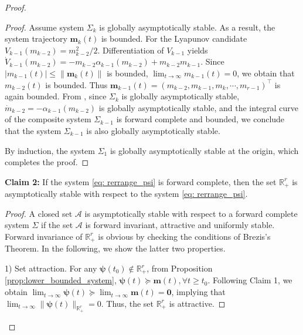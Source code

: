 \documentclass[letterpaper, 10 pt, journal, twoside]{IEEEtran}
\theoremstyle{plain}
\newcommand{\myvar}[1]{\bm{#1}}
\newcommand{\myset}[1]{\mathscr{#1}}
\begin{document}
\begin{proof}
\begin{proof}
Assume system  $\Sigma_{k}$ is globally asymptotically stable.  As a result, the system trajectory $\myvar{m}_k(t)$ is bounded.  {For the} Lyapunov candidate $V_{k-1}(m_{k-2}) = m_{k-2}^2/2$. Differentiation of $V_{k-1}$ yields $ \dot{V}_{k-1}(m_{k-2})  = - m_{k-2}\alpha_{k-1}(m_{k-2})  + m_{k-2} m_{k-1}$.
 Since $| m_{k-1}(t)| \leq \| \myvar{m}_k(t) \| $ is bounded, $\lim_{t \to \infty} m_{k-1}(t) = 0$, we obtain that $ m_{k-2}(t)$ is bounded. Thus $\myvar{m}_{k-1}(t) = (m_{k-2}, m_{k-1}, m_{k}, \cdots, m_{r-1})^\top$ is again bounded. From \cite[Corollary 10.3.3]{isidori1999nonlinear}, since  $ \Sigma_{k}$ is globally asymptotically stable, $\dot{m}_{k-2} = -\alpha_{k-1}(m_{k-2}) $ is globally asymptotically stable, and the integral curve of the composite system $ \Sigma_{k-1}$ is forward complete and bounded, we conclude that the system   $ \Sigma_{k-1}$ is also globally asymptotically stable.


By induction, the system $\Sigma_{1}$ is globally asymptotically stable at the origin, which completes the proof.
  \end{proof}
  
  \noindent \textbf{Claim 2:} If the system \eqref{eq: rerrange_psi} is forward complete, then the set $\mathbb{R}_{+}^{r}$ is asymptotically stable with respect to the system \eqref{eq: rerrange_psi}.
  \begin{proof}
  A closed set $\myset{A}$ is asymptotically stable with respect to a forward complete system $\Sigma$ if the set $\myset{A}$ is forward invariant, attractive and uniformly stable\cite{el2007passivity}. Forward invariance of $\mathbb{R}_{+}^{r}$ is obvious by checking the conditions of Brezis's Theorem.  In the following, we show the latter two properties.

   
    1) Set attraction. For any $\myvar{\psi}(t_0) \notin \mathbb{R}_+^r$, from Proposition \ref{prop:lower_bounded_system}, $\myvar{\psi}(t) \succeq \myvar{m}(t), \forall t\ge t_0$. Following Claim 1, we obtain $  \lim_{t\to \infty} \myvar{\psi}(t) \succeq \lim_{t\to \infty}\myvar{m}(t) = \myvar{0}$,  implying that $\lim_{t\to \infty} \| \myvar{\psi}(t) \|_{\mathbb{R}_{+}^{r}} = 0$. Thus, the set $\mathbb{R}_{+}^{r}$ is attractive. 
    

\end{proof}
\end{proof}
\end{document}
